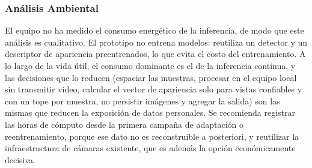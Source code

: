\subsubsection{Análisis Ambiental}
\label{subsec:impacto-ambiental}

El equipo no ha medido el consumo energético de la inferencia, de modo que este análisis es
cualitativo. El prototipo no entrena modelos: reutiliza un detector y un descriptor de
apariencia preentrenados, lo que evita el costo del entrenamiento. A lo largo de la vida útil, el
consumo dominante es el de la inferencia continua, y las decisiones que lo reducen (espaciar
las muestras, procesar en el equipo local sin transmitir video, calcular el vector de apariencia
solo para vistas confiables y con un tope por muestra, no persistir imágenes y agregar la salida)
son las mismas que reducen la exposición de datos personales. Se recomienda registrar las
horas de cómputo desde la primera campaña de adaptación o reentrenamiento, porque ese dato
no es reconstruible a posteriori, y reutilizar la infraestructura de cámaras existente, que es
además la opción económicamente decisiva.
